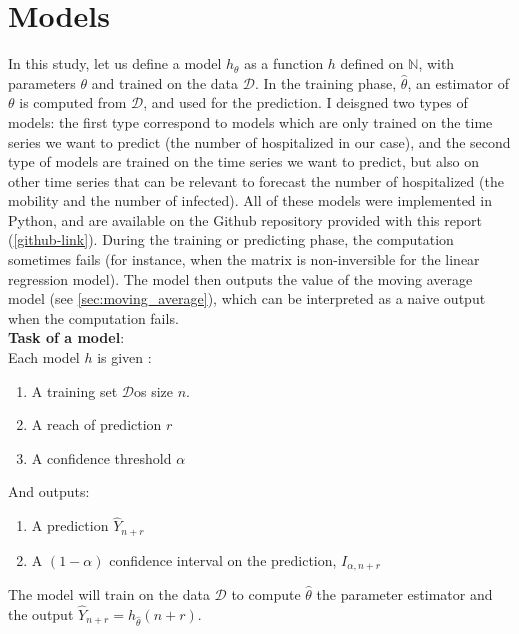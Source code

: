 \section{Models}



In this study, let us define a model ${h}_{\theta }$ as a function ${h}$  defined on $ \mathbb{N}$, with parameters $\theta$ and trained on the data $\mathcal{D}$.
In the training phase, $\hat{\theta}$,  an estimator of $\theta$ is computed from $\mathcal{D}$, and used for the prediction.  
I deisgned two types of models: the first type correspond to models which are only trained on the time series we want to predict (the number of hospitalized in our case), and the second type of models are trained on the time series we want to predict, but also on other time series that can be relevant to forecast the number of hospitalized (the mobility and the number of infected). 
All of these models were implemented in Python, and are available on the Github repository provided with this report (\ref{github-link}).
During the training or predicting phase, the computation sometimes fails (for instance, when the matrix is non-inversible for the linear regression model). 
The model then outputs the value of the moving average model (see \ref{sec:moving_average}), which can be interpreted as a naive output when the computation fails. \\[0.3cm]
\textbf{Task of a model}: \\

Each model ${h}$ is given : 

\begin{enumerate}
    \item A training set $\mathcal{D}$os size $n$. 
    \item A reach of prediction $r$
    \item A confidence threshold $\alpha$
\end{enumerate}


And outputs: 

\begin{enumerate}
    \item A prediction $\hat{Y}_{n+r}$
    \item A $(1-\alpha)$ confidence interval on the prediction, $I_{\alpha, n+r}$
\end{enumerate}

The model will train on the data $\mathcal{D}$ to compute $\hat{\theta}$ the parameter estimator and the output $\hat{Y}_{n+r} = {h}_{\hat{\theta}}(n+r)$.


